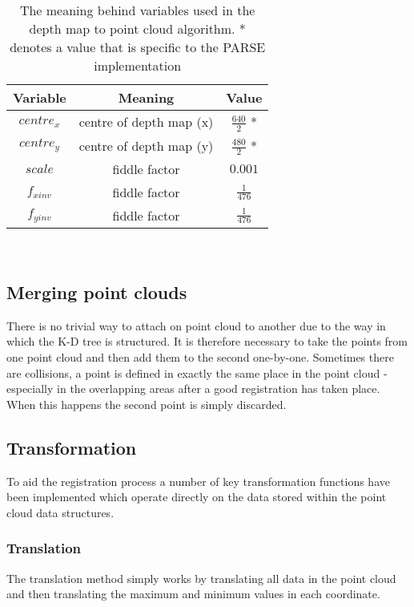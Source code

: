 \begin{table}[h!]
    \centering
    \begin{tabular}{ |c | c | c |}
    \hline
        Variable   & Meaning                  & Value \\ \hline
        $centre_x$ & centre of depth map (x)  & $\frac{640}{2}$ * \\
        $centre_y$ & centre of depth map (y)  & $\frac{480}{2}$ * \\
        $scale$    & fiddle factor            & $0.001$ \\
        $f_{xinv}$ & fiddle factor            & $\frac{1}{476}$ \\
        $f_{yinv}$ & fiddle factor            & $\frac{1}{476}$ \\  
        \hline
    \end{tabular}
    \caption[The meaning behind variables used in the depth map to point cloud algorithm]{The meaning behind variables used in the depth map to point cloud algorithm. * denotes a value that is specific to the PARSE implementation} 
    \label{fig:pc conv meaning}
\end{table} \\

\subsection{Merging point clouds}
There is no trivial way to attach on point cloud to another due to the way in which the K-D tree is structured. It is therefore necessary to take the points from one point cloud and then add them to the second one-by-one. Sometimes there are collisions, a point is defined in exactly the same place in the point cloud - especially in the overlapping areas after a good registration has taken place. When this happens the second point is simply discarded. \\

\subsection{Transformation}
To aid the registration process a number of key transformation functions have been implemented which operate directly on the data stored within the point cloud data structures. \\

\subsubsection{Translation}
The translation method simply works by translating all data in the point cloud and then translating the maximum and minimum values in each coordinate. \\


